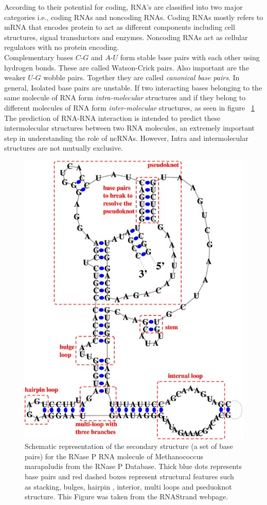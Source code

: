 \documentclass[twoside,a4paper]{report}
\begin{document}
	According to their potential for coding, RNA's are classified into two major categories i.e., coding RNAs and noncoding RNAs. Coding RNAs mostly refers to mRNA that encodes protein to act as different components including cell structures, signal transductors and enzymes. Noncoding RNAs act as cellular regulators with no protein encoding.\\
	Complementary bases $C$-$G$ and $A$-$U$ form stable base pairs with each other using hydrogen bonds. These are called Watson-Crick pairs. Also important are the weaker $U$-$G$ wobble pairs. Together they are called \textit{canonical base pairs}. In general, Isolated base pairs are unstable. If two interacting bases belonging to the same molecule of RNA form \textit{intra-molecular} structures and if they belong to different molecules of RNA form \textit{inter-molecular} structures, as seen in figure ~\ref{fig:secondarystructure}\\
	
	The prediction of RNA-RNA interaction is intended to predict these intermolecular structures between two RNA molecules, an extremely important step in understanding the role of ncRNAs. However, Intra and intermolecular structures are not mutually exclusive.\\
	
	\begin{figure}[h]
	\includegraphics[width=0.7\linewidth]{secondary_structure}
	\centering
	\caption{Schematic representation of the secondary structure (a set of base pairs) for the RNase P RNA molecule of Methanococcus marapaludis from the RNase P Database. Thick blue dots represents base pairs and red dashed boxes represent structural features such as stacking, bulges, hairpin , interior, multi loops and pseduoknot structure. This Figure was taken from the RNAStrand webpage.
	\label{fig:secondarystructure} 
    \citep{andronescu2008rna}}
	\end{figure}
\end{document}
